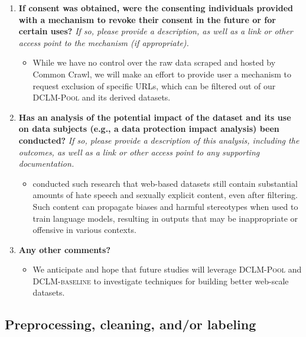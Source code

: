 \documentclass{article}
\newcommand{\rawpool}{\textsc{DCLM-Pool}\xspace}
\newcommand{\hqpool}{\textsc{DCLM-baseline}\xspace}
\newcommand{\commoncrawl}{Common Crawl\xspace}
\begin{document}
\begin{enumerate}[label=Q\arabic*, resume]
\item \textbf{If consent was obtained, were the consenting individuals provided with a mechanism to revoke their consent in the future or for certain uses?} \textit{If so, please provide a description, as well as a link or other access point to the mechanism (if appropriate).}


\begin{itemize}
\item While we have no control over the raw data scraped and hosted by \commoncrawl, we will make an effort to provide user a mechanism to request exclusion of specific URLs, which can be filtered out of our \rawpool and its derived datasets.
\end{itemize}

\item \textbf{Has an analysis of the potential impact of the dataset and its use on data subjects (e.g., a data protection impact analysis) been conducted?} \textit{If so, please provide a description of this analysis, including the outcomes, as well as a link or other access point to any supporting documentation.}

\begin{itemize}
\item \citet{Luccioni2021WhatsIT,Bender2021OnTD} conducted such research that web-based datasets still contain substantial amounts of hate speech and sexually explicit content, even after filtering. Such content can propagate biases and harmful stereotypes when used to train language models, resulting in outputs that may be inappropriate or offensive in various contexts.
\end{itemize}

\item \textbf{Any other comments?}


\begin{itemize}
\item We anticipate and hope that future studies will leverage \rawpool and \hqpool to investigate techniques for building better web-scale datasets.
\end{itemize}

\end{enumerate}

\subsection{Preprocessing, cleaning, and/or labeling}
\end{document}

